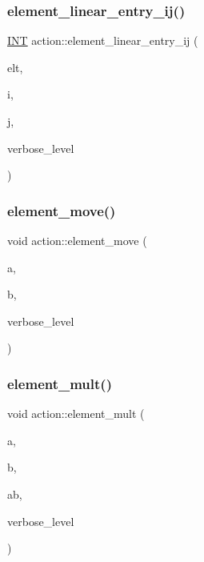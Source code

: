 \mbox{\label{classaction_a91226caa0b6e72b1d72a2cf9a294dfb2}} 
\subsubsection{\texorpdfstring{element\+\_\+linear\+\_\+entry\+\_\+ij()}{element\_linear\_entry\_ij()}}
{\footnotesize\ttfamily \mbox{\hyperlink{galois_8h_a09fddde158a3a20bd2dcadb609de11dc}{I\+NT}} action\+::element\+\_\+linear\+\_\+entry\+\_\+ij (\begin{DoxyParamCaption}\item[{void $\ast$}]{elt,  }\item[{\mbox{\hyperlink{galois_8h_a09fddde158a3a20bd2dcadb609de11dc}{I\+NT}}}]{i,  }\item[{\mbox{\hyperlink{galois_8h_a09fddde158a3a20bd2dcadb609de11dc}{I\+NT}}}]{j,  }\item[{\mbox{\hyperlink{galois_8h_a09fddde158a3a20bd2dcadb609de11dc}{I\+NT}}}]{verbose\+\_\+level }\end{DoxyParamCaption})}

\mbox{\label{classaction_a550947491bbb534d3d7951f50198a874}} 
\subsubsection{\texorpdfstring{element\+\_\+move()}{element\_move()}}
{\footnotesize\ttfamily void action\+::element\+\_\+move (\begin{DoxyParamCaption}\item[{void $\ast$}]{a,  }\item[{void $\ast$}]{b,  }\item[{\mbox{\hyperlink{galois_8h_a09fddde158a3a20bd2dcadb609de11dc}{I\+NT}}}]{verbose\+\_\+level }\end{DoxyParamCaption})}

\mbox{\label{classaction_ae9e36b2cae1f0f7bd7144097fa9a34b3}} 
\subsubsection{\texorpdfstring{element\+\_\+mult()}{element\_mult()}}
{\footnotesize\ttfamily void action\+::element\+\_\+mult (\begin{DoxyParamCaption}\item[{void $\ast$}]{a,  }\item[{void $\ast$}]{b,  }\item[{void $\ast$}]{ab,  }\item[{\mbox{\hyperlink{galois_8h_a09fddde158a3a20bd2dcadb609de11dc}{I\+NT}}}]{verbose\+\_\+level }\end{DoxyParamCaption})}

